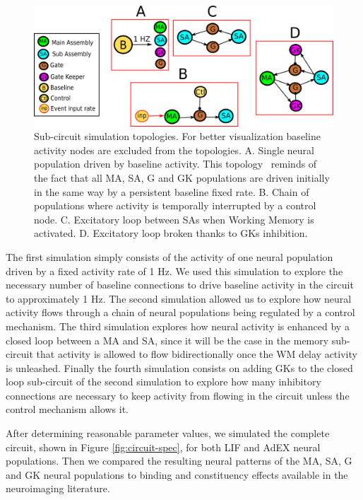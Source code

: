 \documentclass[10pt]{article}
\begin{document}
\begin{figure}[h!]
  \begin{center}
    \includegraphics[width=0.9\columnwidth]{figures/sub_circuits}
    \caption{Sub-circuit simulation topologies.
      For better visualization baseline activity nodes are excluded from the topologies.
      A. Single neural population driven by baseline activity.
      This topology~ reminds of the fact that all MA, SA, G and GK populations are driven initially in the same way by a persistent baseline fixed rate.
      B. Chain of populations where activity is temporally interrupted by a control node.
      C. Excitatory loop between SAs when Working Memory is activated.
      D. Excitatory loop broken thanks to GKs inhibition. {\label{sub_circuits}}%
    }
  \end{center}
\end{figure}

The first simulation simply consists of the activity of one neural population driven by a fixed activity rate of 1 Hz.
We used this simulation to explore the necessary number of baseline connections to drive baseline activity in the circuit to approximately 1 Hz.
The second simulation allowed us to explore how neural activity flows through a chain of neural populations being regulated by a control mechanism.
The third simulation explores how neural activity is enhanced by a closed loop between a MA and SA, since it will be the case in the memory sub-circuit that activity is allowed to flow bidirectionally once the WM delay activity is unleashed.
Finally the fourth simulation consists on adding GKs to the closed loop sub-circuit of the second simulation to explore how many inhibitory connections are necessary to keep activity from flowing in the circuit unless the control mechanism allows it.

After determining reasonable parameter values, we simulated the complete circuit, shown in Figure \ref{fig:circuit-spec}, for both LIF and AdEX neural populations.
Then we compared the resulting neural patterns of the MA, SA, G and GK neural populations to binding and constituency effects available in the neuroimaging literature.
\end{document}
